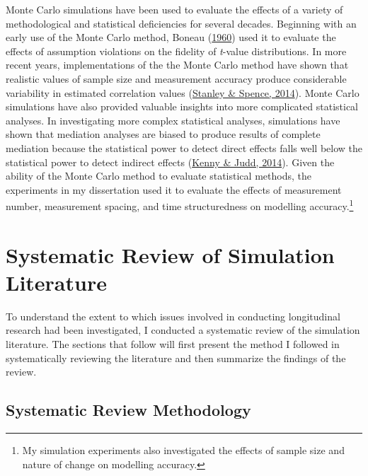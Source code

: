 \documentclass[
12pt, %
twoside,
english]{guelphthesis}
\begin{document}
Monte Carlo simulations have been used to evaluate the effects of a variety of methodological and statistical deficiencies for several decades. Beginning with an early use of the Monte Carlo method, Boneau (\protect\hyperlink{ref-boneau1960}{1960}) used it to evaluate the effects of assumption violations on the fidelity of \emph{t}-value distributions. In more recent years, implementations of the the Monte Carlo method have shown that realistic values of sample size
and measurement accuracy produce considerable variability in estimated correlation values (\protect\hyperlink{ref-stanley2014}{Stanley \& Spence, 2014}). Monte Carlo simulations have also provided valuable insights into more complicated statistical analyses. In investigating more complex statistical analyses, simulations have shown that mediation analyses are biased to produce results of complete mediation because the statistical power to detect direct effects falls well below the statistical power to detect indirect effects (\protect\hyperlink{ref-kenny2014}{Kenny \& Judd, 2014}). Given the ability of the Monte Carlo method to evaluate statistical methods, the experiments in my dissertation used it to evaluate the effects of measurement number, measurement spacing, and time structuredness on modelling accuracy.\footnote{My simulation experiments also investigated the effects of sample size and nature of change on modelling accuracy.}

\hypertarget{systematic-review-of-simulation-literature}{%
\section{Systematic Review of Simulation Literature}\label{systematic-review-of-simulation-literature}}

To understand the extent to which issues involved in conducting longitudinal research had been investigated, I conducted a systematic review of the simulation literature. The sections that follow will first present the method I followed in systematically reviewing the literature and then summarize the findings of the review.

\hypertarget{systematic-review-methodology}{%
\subsection{Systematic Review Methodology}\label{systematic-review-methodology}}
\end{document}
